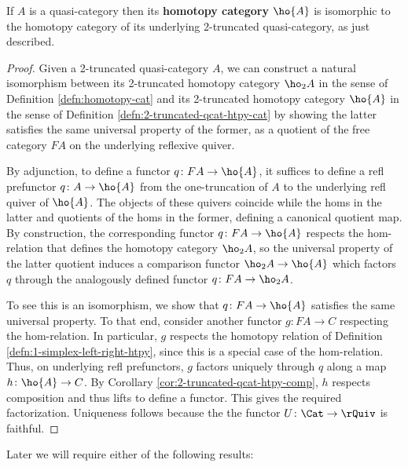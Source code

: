    \begin{lemma}\label{lem:htpy-cat-of-qcat} If $A$ is a quasi-category then its \textbf{homotopy category} $\ho{A}$ is isomorphic to the homotopy category of its underlying 2-truncated quasi-category, as just described.
   \end{lemma}
 \begin{proof}
Given a 2-truncated quasi-category $A$, we can construct a natural isomorphism between its 2-truncated homotopy category $\ho_2A$ in the sense of Definition \ref{defn:homotopy-cat} and its 2-truncated homotopy category $\ho{A}$ in the sense of Definition \ref{defn:2-truncated-qcat-htpy-cat} by showing the latter satisfies the same universal property of the former, as a quotient of the free category $FA$ on the underlying reflexive quiver.

By adjunction, to define a functor $q \colon FA \to \ho{A}$, it suffices to define a refl prefunctor $q \colon A \to \ho{A}$ from the one-truncation of $A$ to the underlying refl quiver of $\ho{A}$. The objects of these quivers coincide while the homs in the latter and quotients of the homs in the former, defining a canonical quotient map. By construction, the corresponding functor $q \colon FA \to \ho{A}$ respects the hom-relation that defines the homotopy category $\ho_2{A}$, so the universal property of the latter quotient induces a comparison functor $\ho_2{A} \to \ho{A}$ which factors $q$ through the analogously defined functor $q \colon FA \to \ho_2{A}$.

To see this is an isomorphism, we show that $q \colon FA \to \ho{A}$ satisfies the same universal property. To that end, consider another functor $g \colon FA \to C$ respecting the hom-relation. In particular, $g$ respects the homotopy relation of Definition \ref{defn:1-simplex-left-right-htpy}, since this is a special case of the hom-relation. Thus, on underlying refl prefunctors, $g$ factors uniquely through $q$ along a map $h \colon \ho{A} \to C$. By Corollary \ref{cor:2-truncated-qcat-htpy-comp}, $h$ respects composition and thus lifts to define a functor. This gives the required factorization. Uniqueness follows because the the functor $U \colon \Cat \to \rQuiv$ is faithful.
\end{proof}

Later we will require either of the following results:

